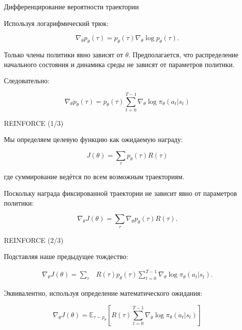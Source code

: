 \documentclass{beamer}
\begin{document}
	\begin{frame}{Дифференцирование вероятности траектории}
		\begin{flushleft}
			
			Используя логарифмический трюк:
			
			\[
			\nabla_\theta p_\theta(\tau)
			=
			p_\theta(\tau)
			\nabla_\theta\log p_\theta(\tau).
			\]
			
			Только члены политики явно зависят от $\theta$.
			Предполагается, что распределение начального состояния и динамика среды
			не зависят от параметров политики.
			
			Следовательно:
			
			\[
			\boxed{
				\nabla_\theta p_\theta(\tau)
				=
				p_\theta(\tau)
				\sum_{t=0}^{T-1}
				\nabla_\theta\log\pi_\theta(a_t|s_t)
			}
			\]
			
		\end{flushleft}
	\end{frame}
	
	\begin{frame}{REINFORCE (1/3)}
		\begin{flushleft}
			
			Мы определяем целевую функцию как ожидаемую награду:
			
			\[
			\boxed{
				J(\theta)
				=
				\sum_\tau p_\theta(\tau)R(\tau)
			}
			\]
			
			где суммирование ведётся по всем возможным траекториям.
			
			Поскольку награда фиксированной траектории не
			зависит явно от параметров политики:
			
			\[
			\nabla_\theta J(\theta)
			=
			\sum_\tau
			\nabla_\theta p_\theta(\tau)R(\tau).
			\]
			
		\end{flushleft}
	\end{frame}
	
	\begin{frame}{REINFORCE (2/3)}
		\begin{flushleft}
			
			Подставляя наше предыдущее тождество:
			
			\[
			\begin{aligned}
				\nabla_\theta J(\theta)
				=
				\sum_\tau
				&R(\tau) p_\theta(\tau)
				\sum_{t=0}^{T-1}
				\nabla_\theta\log\pi_\theta(a_t|s_t).
			\end{aligned}
			\]
			
			Эквивалентно, используя определение математического ожидания:
			
			\[
			\boxed{
				\nabla_\theta J(\theta)
				=
				\mathbb{E}_{\tau\sim p_\theta}
				\left[
				R(\tau)
				\sum_{t=0}^{T-1}
				\nabla_\theta\log\pi_\theta(a_t|s_t)
				\right]
			}
			\]
			
		\end{flushleft}
	\end{frame}
	
\end{document}
